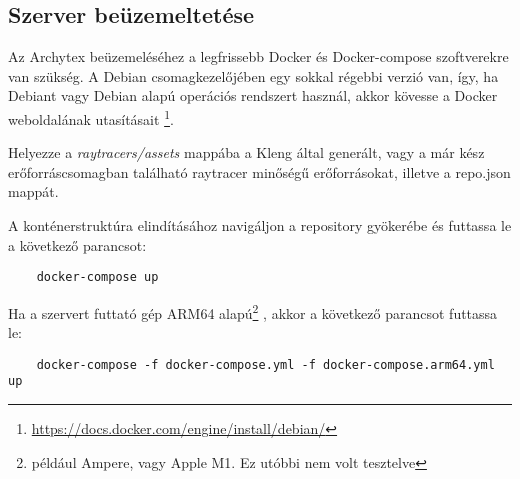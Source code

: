 \subsection{Szerver beüzemeltetése}
Az Archytex beüzemeléséhez a legfrissebb Docker és Docker-compose szoftverekre van szükség. A Debian csomagkezelőjében egy sokkal régebbi verzió van, így, ha Debiant vagy Debian alapú operációs rendszert használ, akkor kövesse a Docker weboldalának utasításait \footnote{\url{https://docs.docker.com/engine/install/debian/}}.

Helyezze a \emph{raytracers/assets} mappába a Kleng által generált, vagy a már kész erőforráscsomagban található raytracer minőségű erőforrásokat, illetve a repo.json mappát. 

A konténerstruktúra elindításához navigáljon a repository gyökerébe és futtassa le a következő parancsot:
\begin{lstlisting}
    docker-compose up
\end{lstlisting}

Ha a szervert futtató gép ARM64 alapú\footnote{például Ampere, vagy Apple M1. Ez utóbbi nem volt tesztelve} , akkor a következő parancsot futtassa le:
\begin{lstlisting}
    docker-compose -f docker-compose.yml -f docker-compose.arm64.yml up
\end{lstlisting}
